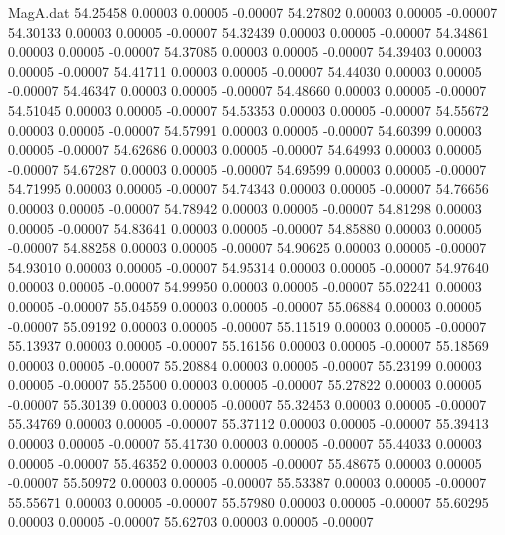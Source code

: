 \begin{filecontents}{MagA.dat}
  54.25458    0.00003    0.00005   -0.00007
  54.27802    0.00003    0.00005   -0.00007
  54.30133    0.00003    0.00005   -0.00007
  54.32439    0.00003    0.00005   -0.00007
  54.34861    0.00003    0.00005   -0.00007
  54.37085    0.00003    0.00005   -0.00007
  54.39403    0.00003    0.00005   -0.00007
  54.41711    0.00003    0.00005   -0.00007
  54.44030    0.00003    0.00005   -0.00007
  54.46347    0.00003    0.00005   -0.00007
  54.48660    0.00003    0.00005   -0.00007
  54.51045    0.00003    0.00005   -0.00007
  54.53353    0.00003    0.00005   -0.00007
  54.55672    0.00003    0.00005   -0.00007
  54.57991    0.00003    0.00005   -0.00007
  54.60399    0.00003    0.00005   -0.00007
  54.62686    0.00003    0.00005   -0.00007
  54.64993    0.00003    0.00005   -0.00007
  54.67287    0.00003    0.00005   -0.00007
  54.69599    0.00003    0.00005   -0.00007
  54.71995    0.00003    0.00005   -0.00007
  54.74343    0.00003    0.00005   -0.00007
  54.76656    0.00003    0.00005   -0.00007
  54.78942    0.00003    0.00005   -0.00007
  54.81298    0.00003    0.00005   -0.00007
  54.83641    0.00003    0.00005   -0.00007
  54.85880    0.00003    0.00005   -0.00007
  54.88258    0.00003    0.00005   -0.00007
  54.90625    0.00003    0.00005   -0.00007
  54.93010    0.00003    0.00005   -0.00007
  54.95314    0.00003    0.00005   -0.00007
  54.97640    0.00003    0.00005   -0.00007
  54.99950    0.00003    0.00005   -0.00007
  55.02241    0.00003    0.00005   -0.00007
  55.04559    0.00003    0.00005   -0.00007
  55.06884    0.00003    0.00005   -0.00007
  55.09192    0.00003    0.00005   -0.00007
  55.11519    0.00003    0.00005   -0.00007
  55.13937    0.00003    0.00005   -0.00007
  55.16156    0.00003    0.00005   -0.00007
  55.18569    0.00003    0.00005   -0.00007
  55.20884    0.00003    0.00005   -0.00007
  55.23199    0.00003    0.00005   -0.00007
  55.25500    0.00003    0.00005   -0.00007
  55.27822    0.00003    0.00005   -0.00007
  55.30139    0.00003    0.00005   -0.00007
  55.32453    0.00003    0.00005   -0.00007
  55.34769    0.00003    0.00005   -0.00007
  55.37112    0.00003    0.00005   -0.00007
  55.39413    0.00003    0.00005   -0.00007
  55.41730    0.00003    0.00005   -0.00007
  55.44033    0.00003    0.00005   -0.00007
  55.46352    0.00003    0.00005   -0.00007
  55.48675    0.00003    0.00005   -0.00007
  55.50972    0.00003    0.00005   -0.00007
  55.53387    0.00003    0.00005   -0.00007
  55.55671    0.00003    0.00005   -0.00007
  55.57980    0.00003    0.00005   -0.00007
  55.60295    0.00003    0.00005   -0.00007
  55.62703    0.00003    0.00005   -0.00007

\end{filecontents}
